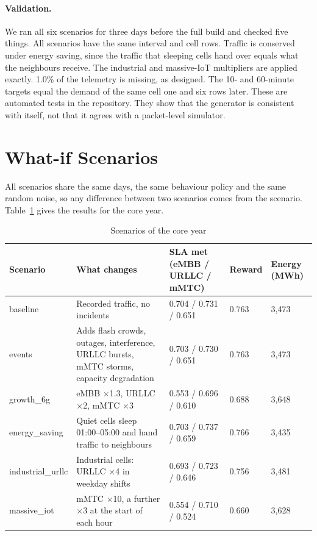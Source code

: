 \paragraph{Validation.}
We ran all six scenarios for three days before the full build and checked five things. All scenarios have the same interval and cell rows. Traffic is conserved under energy saving, since the traffic that sleeping cells hand over equals what the neighbours receive. The industrial and massive-IoT multipliers are applied exactly. 1.0\% of the telemetry is missing, as designed. The 10- and 60-minute targets equal the demand of the same cell one and six rows later. These are automated tests in the repository. They show that the generator is consistent with itself, not that it agrees with a packet-level simulator.

\section{What-if Scenarios}
\label{sec:scenarios}
All scenarios share the same days, the same behaviour policy and the same random noise, so any difference between two scenarios comes from the scenario. Table~\ref{tab:scenarios} gives the results for the core year.
\begin{table}[htbp]
	\centering
	\caption{Scenarios of the core year}
	\label{tab:scenarios}
	\footnotesize
	\begin{tabular}{|p{2.3cm}|p{4.6cm}|p{3.4cm}|p{1.3cm}|p{1.8cm}|}
		\hline
		\textbf{Scenario} & \textbf{What changes} & \textbf{SLA met (eMBB / URLLC / mMTC)} & \textbf{Reward} & \textbf{Energy (MWh)} \\
		\hline
		baseline & Recorded traffic, no incidents & 0.704 / 0.731 / 0.651 & 0.763 & 3{,}473 \\
		\hline
		events & Adds flash crowds, outages, interference, URLLC bursts, mMTC storms, capacity degradation & 0.703 / 0.730 / 0.651 & 0.763 & 3{,}473 \\
		\hline
		growth\_6g & eMBB $\times$1.3, URLLC $\times$2, mMTC $\times$3 & 0.553 / 0.696 / 0.610 & 0.688 & 3{,}648 \\
		\hline
		energy\_saving & Quiet cells sleep 01:00--05:00 and hand traffic to neighbours & 0.703 / 0.737 / 0.659 & 0.766 & 3{,}435 \\
		\hline
		industrial\_urllc & Industrial cells: URLLC $\times$4 in weekday shifts & 0.693 / 0.723 / 0.646 & 0.756 & 3{,}481 \\
		\hline
		massive\_iot & mMTC $\times$10, a further $\times$3 at the start of each hour & 0.554 / 0.710 / 0.524 & 0.660 & 3{,}628 \\
		\hline
	\end{tabular}
\end{table}


